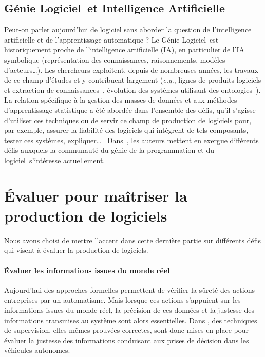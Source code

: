 \documentclass[11pt]{article}
\newcommand{\gpl}[0]{génie de la programmation et du logiciel\xspace}
\newcommand{\GL}[0]{Génie Logiciel\xspace}
\newcommand{\eg}[0]{\emph{e.g.},\xspace}
\newcommand{\defi}[1]{\cite[défi]{#1}}
\begin{document}
\subsection{\GL~et Intelligence Artificielle\label{ss:maintenance:IA}}
Peut-on parler aujourd'hui de logiciel sans aborder la question de l'intelligence artificielle et de l'apprentissage automatique ? %
Le \GL~est historiquement proche de l'intelligence artificielle (IA), en particulier de l'IA symbolique (représentation des connaissances, raisonnements, modèles d'acteurs\ldots). Les chercheurs exploitent, depuis de nombreuses années, les travaux de ce champ d'études et y contribuent largement (\eg lignes de produits logiciels  et extraction de connaissances~\cite{Carbonnel2020}, évolution des systèmes utilisant des ontologies~\cite{Quinton2020}). La relation spécifique à la gestion des masses de données et aux méthodes d'apprentissage statistique a été abordée dans l'ensemble des défis, qu'il s'agisse d'utiliser ces techniques ou de servir ce champ de production de logiciels pour, par exemple, assurer la fiabilité des logiciels qui intègrent de tels composants, tester ces systèmes, expliquer\ldots~
Dans~\cite{IA}, les auteurs mettent en exergue différents défis auxquels la communauté du \gpl~s'intéresse actuellement.

\section{Évaluer pour maîtriser la production de logiciels \label{s:evaluation}}
Nous avons choisi de mettre l'accent dans cette dernière partie sur différents défis %
qui visent à évaluer la production de logiciels.

\paragraph{Évaluer les informations issues du monde réel}
Aujourd'hui des approches formelles permettent de vérifier la sûreté des actions entreprises par un automatisme. Mais lorsque ces actions s'appuient sur les informations issues du monde réel, la précision de ces données et la justesse des informations transmises au système sont alors essentielles. Dans \defi{emergents}, 
des techniques de supervision,
elles-mêmes prouvées correctes, sont donc mises en place pour évaluer la justesse des informations conduisant aux prises de décision dans les véhicules autonomes.
 
\end{document}
